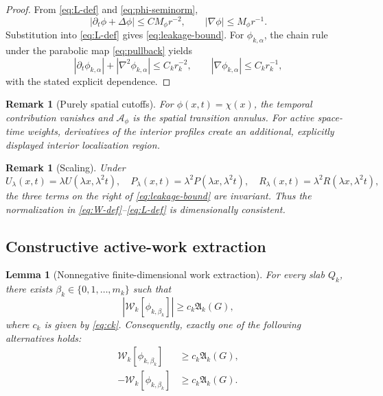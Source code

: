 \documentclass[10pt,a4paper]{amsart}
\numberwithin{equation}{section}
\newtheorem{lemma}[theorem]{Lemma}
\newtheorem{remark}[theorem]{Remark}
\newcommand{\abs}[1]{\left\lvert #1\right\rvert}
\newcommand{\W}{\mathcal W}
\newcommand{\Aact}{\mathfrak A}
\begin{document}
\begin{proof}
From \eqref{eq:L-def} and \eqref{eq:phi-seminorm},
\[
|\partial_t\phi+\Delta\phi|
\le C M_\phi r^{-2},
\qquad
|\nabla\phi|
\le M_\phi r^{-1}.
\]
Substitution into \eqref{eq:L-def} gives \eqref{eq:leakage-bound}. For \(\phi_{k,\alpha}\), the chain rule under the parabolic map \eqref{eq:pullback} yields
\[
|\partial_t\phi_{k,\alpha}|+|\nabla^2\phi_{k,\alpha}|
\le C_k r_k^{-2},
\qquad
|\nabla\phi_{k,\alpha}|
\le C_k r_k^{-1},
\]
with the stated explicit dependence.
\end{proof}

\begin{remark}[Purely spatial cutoffs]
For \(\phi(x,t)=\chi(x)\), the temporal contribution vanishes and \(\mathscr A_\phi\) is the spatial transition annulus. For active space-time weights, derivatives of the interior profiles create an additional, explicitly displayed interior localization region.
\end{remark}

\begin{remark}[Scaling]
Under
\[
U_\lambda(x,t)=\lambda U(\lambda x,\lambda^2t),
\quad
P_\lambda(x,t)=\lambda^2P(\lambda x,\lambda^2t),
\quad
R_\lambda(x,t)=\lambda^2R(\lambda x,\lambda^2t),
\]
the three terms on the right of \eqref{eq:leakage-bound} are invariant. Thus the normalization in \eqref{eq:W-def}--\eqref{eq:L-def} is dimensionally consistent.
\end{remark}

\subsection{Constructive active-work extraction}\label{sec:extraction}

\begin{lemma}[Nonnegative finite-dimensional work extraction]\label{lem:extraction}
For every slab \(Q_k\), there exists \(\beta_k\in\{0,1,\ldots,m_k\}\) such that
\begin{equation}\label{eq:extract-lemma}
\abs{\W_k[\phi_{k,\beta_k}]}
\ge
c_k\Aact_k(G),
\end{equation}
where \(c_k\) is given by \eqref{eq:ck}. Consequently, exactly one of the following alternatives holds:
\begin{align}
\W_k[\phi_{k,\beta_k}]
&\ge c_k\Aact_k(G),
\tag{forward}\label{eq:forward-branch}
\\
-\W_k[\phi_{k,\beta_k}]
&\ge c_k\Aact_k(G).
\tag{backscatter}\label{eq:backscatter-branch}
\end{align}
\end{lemma}
\end{document}
